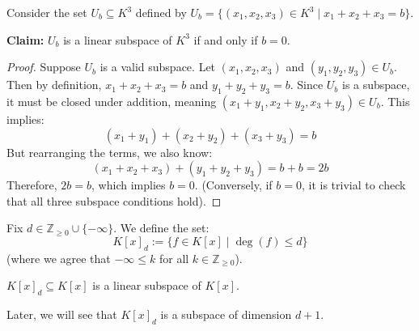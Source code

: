 \begin{example}
Consider the set $U_b \subseteq K^3$ defined by $U_b = \{(x_1, x_2, x_3) \in K^3 \mid x_1 + x_2 + x_3 = b\}$. 

\textbf{Claim:} $U_b$ is a linear subspace of $K^3$ if and only if $b = 0$.

\begin{proof}
Suppose $U_b$ is a valid subspace. Let $(x_1, x_2, x_3)$ and $(y_1, y_2, y_3) \in U_b$. 
Then by definition, $x_1 + x_2 + x_3 = b$ and $y_1 + y_2 + y_3 = b$. 
Since $U_b$ is a subspace, it must be closed under addition, meaning $(x_1 + y_1, x_2 + y_2, x_3 + y_3) \in U_b$. 
This implies:
\[
(x_1 + y_1) + (x_2 + y_2) + (x_3 + y_3) = b
\]
But rearranging the terms, we also know:
\[
(x_1 + x_2 + x_3) + (y_1 + y_2 + y_3) = b + b = 2b
\]
Therefore, $2b = b$, which implies $b = 0$. 
(Conversely, if $b=0$, it is trivial to check that all three subspace conditions hold).
\end{proof}
\end{example}

\begin{example}
Fix $d \in \mathbb{Z}_{\ge 0} \cup \{-\infty\}$. 
We define the set:
\[
K[x]_d := \{f \in K[x] \mid \deg(f) \le d\}
\]
(where we agree that $-\infty \le k$ for all $k \in \mathbb{Z}_{\ge 0}$). 

\begin{claim*}
$K[x]_d \subseteq K[x]$ is a linear subspace of $K[x]$.
\end{claim*}

Later, we will see that $K[x]_d$ is a subspace of dimension $d+1$.
\end{example}